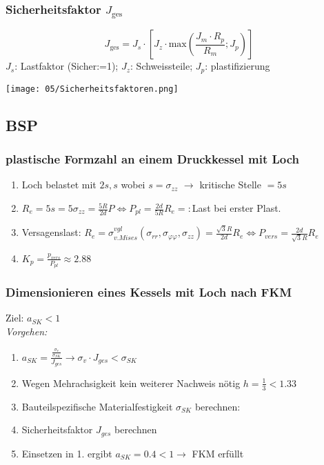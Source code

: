         \subsubsection{Sicherheitsfaktor $J_{\textrm{ges}}$}
        \small\[J_{\textrm{ges}}= J_s \cdot \left[ J_z \cdot \textrm{max}\left(\frac{J_m \cdot R_p}{R_m}; J_p \right) \right] \]\normalsize
        $J_s$: Lastfaktor (Sicher:=1); $J_z$: Schweissteile; $J_p$: plastifizierung
        \begin{center}
            \texttt{[image: 05/Sicherheitsfaktoren.png]}
        \end{center}
    
    \subsection{BSP}
        \subsubsection{plastische Formzahl an einem Druckkessel mit Loch}
            \begin{enumerate}
                \item Loch belastet mit $2s,s$ wobei $s=\sigma_{zz}$ $\rightarrow$ kritische Stelle $=5s$
                \item $R_e=5s=5\sigma_{zz}=\frac{5R}{2d}P \Leftrightarrow P_{pl}=\frac{2d}{5R}R_e=:$Last bei erster Plast.
                \item Versagenslast: $R_e=\sigma_{v.Mises}^{vgl}(\sigma_{rr},\sigma_{\varphi\varphi},\sigma_{zz})=\frac{\sqrt{3}R}{2d}R_e \Leftrightarrow P_{vers}=\frac{2d}{\sqrt{3}R}R_e$
                \item $K_p=\frac{p_{vers}}{P_{pl}}\approx 2.88$
            \end{enumerate}
            
        \subsubsection{Dimensionieren eines Kessels mit Loch nach FKM}
        Ziel: $ a_{SK}<1 $
        \\\textit{Vorgehen:}
        \vspace{-3mm}
        \begin{enumerate}
            \item $ a_{{SK}} = \frac{\frac{\sigma_v}{\sigma_{{SK}}}}{J_{ges}}  \rightarrow  \sigma_v \cdot J_{ges} < \sigma_{{SK}} $
            \item Wegen Mehrachsigkeit kein weiterer Nachweis nötig
            $ h = \frac{1}{3} < 1.33$ 
            \item Bauteilspezifische Materialfestigkeit $ \sigma_{SK} $ berechnen:
            \item Sicherheitsfaktor $J_{ges}$ berechnen
            \item Einsetzen in 1. ergibt $a_{SK}=0.4<1$$\rightarrow$ FKM erfüllt
        \end{enumerate}
        
        
        
        
        
        
        
